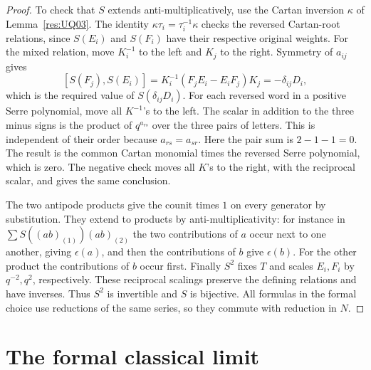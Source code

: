 \begin{proof}
To check that \(S\) extends anti-multiplicatively, use the
Cartan inversion \(\kappa\) of Lemma~\ref{res:UQ03}.
The identity \(\kappa\tau_i=\tau_i^{-1}\kappa\) checks
the reversed Cartan-root relations, since \(S(E_i)\)
and \(S(F_i)\) have their respective original weights.
For the mixed relation, move \(K_i^{-1}\) to the left
and \(K_j\) to the right. Symmetry of \(a_{ij}\) gives
\[
 [S(F_j),S(E_i)]
    =K_i^{-1}(F_jE_i-E_iF_j)K_j=-\delta_{ij}D_i,
\]
which is the required value of \(S(\delta_{ij}D_i)\).
For each reversed word in a positive Serre polynomial,
move all \(K^{-1}\)'s to the left. The scalar in addition
to the three minus signs is the product of \(q^{a_{rs}}\)
over the three pairs of letters. This is independent of
their order because \(a_{rs}=a_{sr}\). Here the pair sum
is \(2-1-1=0\). The result is the common Cartan monomial
times the reversed Serre polynomial, which is zero.
The negative check moves all \(K\)'s to the right,
with the reciprocal scalar, and gives the same conclusion.

The two antipode products give the counit times \(1\)
on every generator by substitution. They extend to products
by anti-multiplicativity: for instance in
\(\sum S((ab)_{(1)})(ab)_{(2)}\) the two contributions of
\(a\) occur next to one another, giving \(\epsilon(a)\),
and then the contributions of \(b\) give \(\epsilon(b)\).
For the other product the contributions of \(b\) occur
first. Finally \(S^2\) fixes \(T\) and scales \(E_i,F_i\)
by \(q^{-2},q^2\), respectively. These reciprocal scalings
preserve the defining relations and have inverses.
Thus \(S^2\) is invertible and \(S\) is bijective.
All formulas in the formal choice use reductions of the
same series, so they commute with reduction in \(N\).
\end{proof}

\section{The formal classical limit}


